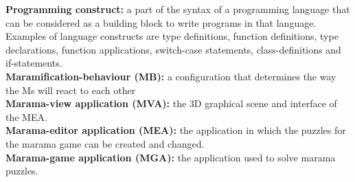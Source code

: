 \textbf{Programming construct:} a part of the syntax of a programming language that can be considered as a building block to write programs in that language. Examples of language constructs are type definitions, function definitions, type declarations, function applications, switch-case statements, class-definitions and if-statements.
\vspace{2mm}\\
\textbf{Maramification-behaviour (MB):} a configuration that determines the way the Ms will react to each other
\vspace{2mm}\\
\textbf{Marama-view application (MVA):} the 3D graphical scene and interface of the MEA.
\vspace{2mm}\\
\textbf{Marama-editor application (MEA):} the application in which the puzzles for the marama game can be created and changed.
\vspace{2mm}\\
\textbf{Marama-game application (MGA):} the application used to solve marama puzzles.

\newpage